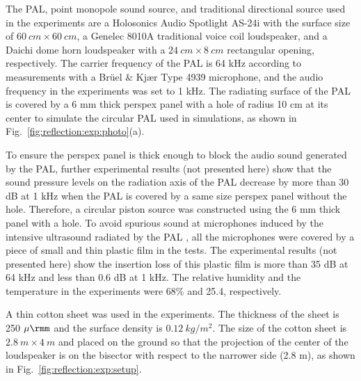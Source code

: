 The PAL, point monopole sound source, and traditional directional source used in the experiments are a Holosonics Audio Spotlight AS-24i with the surface size of $\SI{60}{cm} \times\SI{ 60}{cm}$, a Genelec 8010A traditional voice coil loudspeaker, and a Daichi dome horn loudspeaker with a $\SI{24}{cm}\times\SI{ 8 }{cm}$ rectangular opening, respectively. 
The carrier frequency of the PAL is 64 kHz according to measurements with a Brüel \& Kjær Type 4939 microphone, and the audio frequency in the experiments was set to 1 kHz. 
The radiating surface of the PAL is covered by a 6 mm thick perspex panel with a hole of radius 10 cm at its center to simulate the circular PAL used in simulations, as shown in Fig.~\ref{fig:reflection:exp:photo}(a). 

To ensure the perspex panel is thick enough to block the audio sound generated by the PAL, further experimental results (not presented here) show that the sound pressure levels on the radiation axis of the PAL decrease by more than 30 dB at 1 kHz when the PAL is covered by a same size perspex panel without the hole.
Therefore, a circular piston source was constructed using the 6 mm thick panel with a hole. 
To avoid spurious sound at microphones induced by the intensive ultrasound radiated by the PAL \cite{Ji2019ExperimentalInvestigationParameters}, all the microphones were covered by a piece of small and thin plastic film in the tests.
The experimental results (not presented here) show the insertion loss of this plastic film is more than 35 dB at 64 kHz and less than 0.6 dB at 1 kHz.
The relative humidity and the temperature in the experiments were 68\% and 25.4\celsius, respectively.


A thin cotton sheet was used in the experiments. 
The thickness of the sheet is 250 $\mu\rmm$ and the surface density is $\SI{0.12}{kg/m^2}$. 
The size of the cotton sheet is $\SI{2.8}{m}\times \SI{ 4 }{m}$ and placed on the ground so that the projection of the center of the loudspeaker is on the bisector with respect to the narrower side (2.8 m), as shown in Fig.~\ref{fig:reflection:exp:setup}. 

